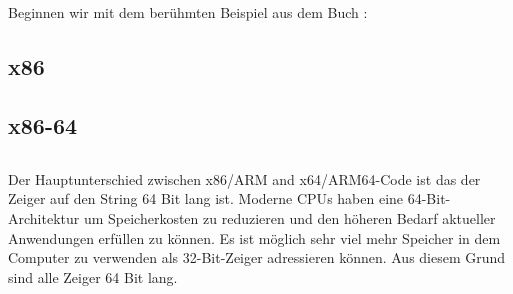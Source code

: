 \section{\HelloWorldSectionName}
\label{sec:helloworld}

Beginnen wir mit dem berühmten Beispiel aus dem Buch \KRBook:



\subsection{x86}





\subsection{x86-64}







\subsection{\Conclusion{}}

Der Hauptunterschied zwischen x86/ARM and x64/ARM64-Code ist das der Zeiger auf den String 64 Bit lang ist.
Moderne \ac{CPU}s haben eine 64-Bit-Architektur um Speicherkosten zu reduzieren und den höheren Bedarf
aktueller Anwendungen erfüllen zu können.
Es ist möglich sehr viel mehr Speicher in dem Computer zu verwenden als 32-Bit-Zeiger adressieren können.
Aus diesem Grund sind alle Zeiger 64 Bit lang.



